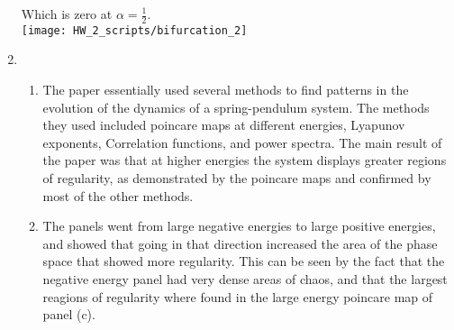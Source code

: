 \documentclass[12pt]{article}
\begin{document}
\begin{enumerate}
    Which is zero at $\alpha=\frac{1}{2}$.\\
    \texttt{[image: HW\_2\_scripts/bifurcation\_2]}
    \item
    \begin{enumerate}
      \item The paper essentially used several methods to find patterns in the evolution of the dynamics of a spring-pendulum system.
      The methods they used included poincare maps at different energies, Lyapunov exponents, Correlation functions, and power spectra.
      The main result of the paper was that at higher energies the system displays greater regions of regularity, as demonstrated by the poincare maps and confirmed by most of the other methods.
      \item The panels went from large negative energies to large positive energies, and showed that going in that direction increased the area of the phase space that showed more regularity.
      This can be seen by the fact that the negative energy panel had very dense areas of chaos, and that the largest reagions of regularity where found in the large energy poincare map of panel (c).
    \end{enumerate}
  \end{enumerate}
\end{document}
